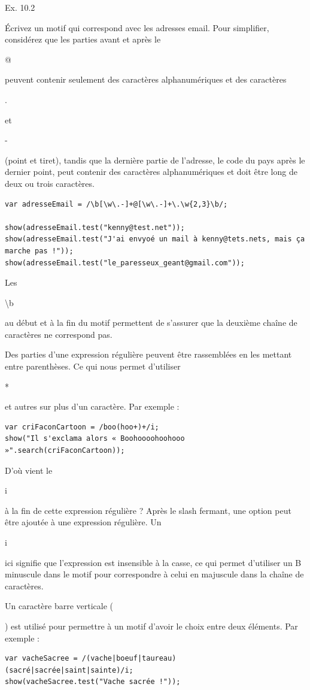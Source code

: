 \documentclass{FramateX}
\renewcommand{\texttt}[1]{\begin{sffamily}{#1}\end{sffamily}}
\begin{document}
\begin{center}\end{center}

Ex. 10.2

Écrivez un motif qui correspond avec les adresses email. Pour
simplifier, considérez que les parties avant et après le \texttt{@}
peuvent contenir seulement des caractères alphanumériques et des
caractères \texttt{.} et \texttt{-} (point et tiret), tandis que la
dernière partie de l'adresse, le code du pays après le dernier point,
peut contenir des caractères alphanumériques et doit être long de deux
ou trois caractères.

\begin{lstlisting}
var adresseEmail = /\b[\w\.-]+@[\w\.-]+\.\w{2,3}\b/;

show(adresseEmail.test("kenny@test.net"));
show(adresseEmail.test("J'ai envyoé un mail à kenny@tets.nets, mais ça marche pas !"));
show(adresseEmail.test("le_paresseux_geant@gmail.com"));
\end{lstlisting}
Les \texttt{\textbackslash{}b} au début et à la fin du motif permettent
de s'assurer que la deuxième chaîne de caractères ne correspond pas.

\begin{center}\end{center}

Des parties d'une expression régulière peuvent être rassemblées en les
mettant entre parenthèses. Ce qui nous permet d'utiliser \texttt{*} et
autres sur plus d'un caractère. Par exemple :

\begin{lstlisting}
var criFaconCartoon = /boo(hoo+)+/i;
show("Il s'exclama alors « Boohoooohoohooo »".search(criFaconCartoon));
\end{lstlisting}
D'où vient le \texttt{i} à la fin de cette expression régulière ? Après
le slash fermant, une option peut être ajoutée à une expression
régulière. Un \texttt{i} ici signifie que l'expression est insensible à
la casse, ce qui permet d'utiliser un B minuscule dans le motif pour
correspondre à celui en majuscule dans la chaîne de caractères.

Un caractère barre verticale (\texttt{\textbar{}}) est utilisé pour
permettre à un motif d'avoir le choix entre deux éléments. Par exemple :

\begin{lstlisting}
var vacheSacree = /(vache|boeuf|taureau) (sacré|sacrée|saint|sainte)/i;
show(vacheSacree.test("Vache sacrée !"));
\end{lstlisting}
\begin{center}\end{center}
\end{document}
